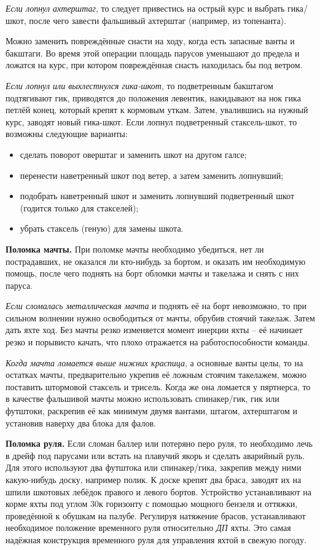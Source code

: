 \textit{Если лопнул ахтерштаг}, то следует привестись на острый курс и выбрать
гика\-/шкот, после чего завести фальшивый ахтерштаг (например, из
топенанта).

Можно заменить повреждённые снасти на ходу, когда есть запасные ванты
и бакштаги. Во время этой операции площадь парусов уменьшают до
предела и ложатся на курс, при котором повреждённая снасть находилась
бы под ветром.

\textit{Если лопнул или выхлестнулся гика-шкот}, то подветренным бакштагом
подтягивают гик, приводятся до положения левентик, накидывают на нок
гика петлёй конец, который крепят к кормовым уткам. Затем, увалившись
на нужный курс, заводят новый гика-шкот.  Если лопнул подветренный
стаксель-шкот, то возможны следующие варианты:
\begin{itemize}
\item сделать поворот оверштаг и заменить шкот на другом галсе; 
\item перенести наветренный шкот под ветер, а затем заменить лопнувший; 
\item подобрать наветренный шкот и заменить лопнувший подветренный шкот (годится только для стакселей); 
\item убрать стаксель (геную) для замены шкота. 
\end{itemize}

\textbf{Поломка мачты.} При поломке мачты необходимо убедиться, нет ли
пострадавших, не оказался ли кто-нибудь за бортом, и оказать им
необходимую помощь, после чего поднять на борт обломки мачты и
такелажа и снять с них паруса.

\textit{Если сломалась металлическая мачта} и поднять её на борт
невозможно, то при сильном волнении нужно освободиться от мачты,
обрубив стоячий такелаж. Затем дать яхте ход. Без мачты резко
изменяется момент инерции яхты \--- её начинает резко и порывисто
качать, что плохо отражается на работоспособности команды.

\textit{Когда мачта ломается выше нижних краспица}, а основные ванты
целы, то на остатках мачты, предварительно укрепив её ложным стоячим
такелажем, можно поставить штормовой стаксель и трисель. Когда же она
ломается у пяртнерса, то в качестве фальшивой мачты можно использовать
спинакер\-/гик, гик или футштоки, раскрепив её как минимум двумя
вантами, штагом, ахтерштагом и установив наверху два блока для фалов.

\textbf{Поломка руля.} Если сломан баллер или потеряно перо руля, то
необходимо лечь в дрейф под парусами или встать на плавучий якорь и
сделать аварийный руль. Для этого используют два футштока или
спинакер\-/гика, закрепив между ними какую-нибудь доску, например
полик. К доске крепят два браса, заводят их на шпили шкотовых лебёдок
правого и левого бортов. Устройство устанавливают на корме яхты под
углом 30\gr к горизонту с помощью мощного бензеля и оттяжки,
проведённой к обушкам на палубе. Регулируя натяжение брасов,
устанавливают необходимое положение временного руля относительно
\textit{ДП} яхты. Это самая надёжная конструкция временного руля для
управления яхтой в свежую погоду.

